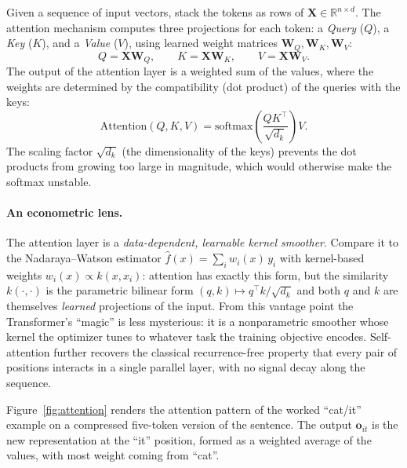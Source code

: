 \documentclass[11pt,a4paper]{report}
\newcommand{\W}{\bm{W}}
\newcommand{\X}{\bm{X}}
\newcommand{\R}{\mathbb{R}}
\begin{document}
Given a sequence of input vectors, stack the tokens as rows of $\X \in \R^{n\times d}$.  The attention mechanism computes three projections for each token: a \emph{Query} ($Q$), a \emph{Key} ($K$), and a \emph{Value} ($V$), using learned weight matrices $\W_Q, \W_K, \W_V$:
\begin{equation}
Q = \X \W_Q, \qquad K = \X \W_K, \qquad V = \X \W_V.
\end{equation}
The output of the attention layer is a weighted sum of the values, where the weights are determined by the compatibility (dot product) of the queries with the keys:
\begin{equation}
\mathrm{Attention}(Q, K, V) = \mathrm{softmax}\left(\frac{Q K^\top}{\sqrt{d_k}}\right) V.
\end{equation}
The scaling factor $\sqrt{d_k}$ (the dimensionality of the keys) prevents the dot products from growing too large in magnitude, which would otherwise make the softmax unstable.

\paragraph{An econometric lens.}  The attention layer is a \emph{data-dependent, learnable kernel smoother}.  Compare it to the Nadaraya--Watson estimator $\hat f(x) = \sum_i w_i(x)\,y_i$ with kernel-based weights $w_i(x) \propto k(x, x_i)$: attention has exactly this form, but the similarity $k(\cdot,\cdot)$ is the parametric bilinear form $(q,k)\mapsto q^{\!\top}k/\sqrt{d_k}$ and both $q$ and $k$ are themselves \emph{learned} projections of the input.  From this vantage point the Transformer's ``magic'' is less mysterious: it is a nonparametric smoother whose kernel the optimizer tunes to whatever task the training objective encodes.  Self-attention further recovers the classical recurrence-free property that every pair of positions interacts in a single parallel layer, with no signal decay along the sequence.

Figure~\ref{fig:attention} renders the attention pattern of the worked ``cat/it'' example on a compressed five-token version of the sentence.  The output $\bm{o}_{\textit{it}}$ is the new representation at the ``it'' position, formed as a weighted average of the values, with most weight coming from ``cat''.
\end{document}
